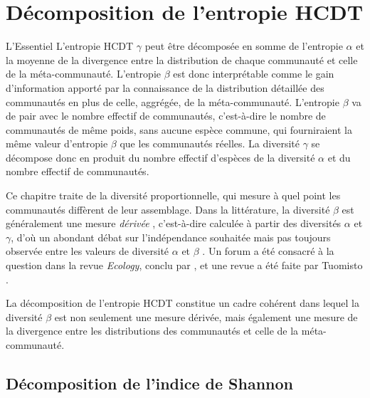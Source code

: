 \documentclass[
  11pt,
  french,
  a4paper,
  extrafontsizes,onecolumn,openright
  ]{memoir}
\newenvironment{Summary}
  {\begin{bclogo}[logo=\bctrombone, noborder=true, couleur=lightgray!50]{L'Essentiel}\parindent0pt}
  {\end{bclogo}}
\begin{document}
\hypertarget{chap:DedompHCDT}{%
\chapter{Décomposition de l'entropie HCDT}\label{chap:DedompHCDT}}

\scriptsize

\begin{Summary}
L'entropie HCDT \(\gamma\) peut être décomposée en somme de l'entropie
\(\alpha\) et la moyenne de la divergence entre la distribution de
chaque communauté et celle de la méta-communauté. L'entropie \(\beta\)
est donc interprétable comme le gain d'information apporté par la
connaissance de la distribution détaillée des communautés en plus de
celle, aggrégée, de la méta-communauté. L'entropie \(\beta\) va de pair
avec le nombre effectif de communautés, c'est-à-dire le nombre de
communautés de même poids, sans aucune espèce commune, qui fourniraient
la même valeur d'entropie \(\beta\) que les communautés réelles. La
diversité \(\gamma\) se décompose donc en produit du nombre effectif
d'espèces de la diversité \(\alpha\) et du nombre effectif de
communautés.
\end{Summary}

\normalsize

Ce chapitre traite de la diversité proportionnelle, qui mesure à quel point les communautés diffèrent de leur assemblage.
Dans la littérature, la diversité \(\beta\) est généralement une mesure \emph{dérivée} \autocite{Ellison2010a}, c'est-à-dire calculée à partir des diversités \(\alpha\) et \(\gamma\), d'où un abondant débat sur l'indépendance souhaitée mais pas toujours observée entre les valeurs de diversité \(\alpha\) et \(\beta\) \autocite{Baselga2010a,Jost2010a,Veech2010a}.
Un forum a été consacré à la question dans la revue \emph{Ecology}, conclu par \textcite{Chao2012a}, et une revue a été faite par Tuomisto \autocite*{Tuomisto2010a,Tuomisto2010b}.

La décomposition de l'entropie HCDT constitue un cadre cohérent dans lequel la diversité \(\beta\) est non seulement une mesure dérivée, mais également une mesure de la divergence entre les distributions des communautés et celle de la méta-communauté.

\hypertarget{duxe9composition-de-lindice-de-shannon}{%
\section{Décomposition de l'indice de Shannon}\label{duxe9composition-de-lindice-de-shannon}}
\end{document}
